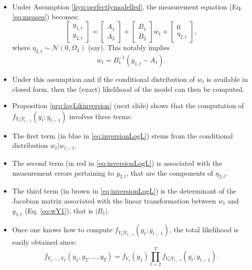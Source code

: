 \documentclass[
  12pt,
]{book}
\providecommand{\tightlist}{%
  \setlength{\itemsep}{0pt}\setlength{\parskip}{0pt}}
\theoremstyle{definition}
\theoremstyle{definition}
\theoremstyle{definition}
\theoremstyle{definition}
\theoremstyle{remark}
\begin{document}
\begin{itemize}
\tightlist
\item
  Under Assumption \ref{hyp:perfectlymodelled}, the measurement equation (Eq. \eqref{eq:measeq}) becomes:
  \[
  \left[
  \begin{array}{c}
  y_{1,t}\\
  y_{2,t}
  \end{array}
  \right]
  =
  \left[
  \begin{array}{c}
  A_{1}\\
  A_{2}
  \end{array}
  \right]+
  \left[
  \begin{array}{c}
  B_{1}\\
  B_{2}
  \end{array}
  \right]w_t +
  \left[
  \begin{array}{c}
  0\\
  \eta_{2,t}
  \end{array}
  \right],
  \]
  where \(\eta_{2,t} \sim \mathcal{N}(0,\Omega_2)\) (say). This notably implies
  \begin{equation}
  w_t = B_{1}^{-1}(y_{1,t} - A_1).\label{eq:wY1}
  \end{equation}
\item
  Under this assumption and if the conditional distribution of \(w_t\) is available in closed form, then the (exact) likelihood of the model can then be computed.
\item
  Proposition \ref{prp:logLikinversion} (next slide) shows that the computation of \(f_{Y_t|\underline{Y_{t-1}}}(y_t;\underline{y_{t-1}})\) involves three terms:
\item
  The first term (in blue in \eqref{eq:inversionLogL}) stems from the conditional distribution \(w_t|\underline{w_{t-1}}\).
\item
  The second term (in red in \eqref{eq:inversionLogL}) is associated with the measurement errors pertaining to \(y_{2,t}\), that are the components of \(\eta_{2,t}\).
\item
  The third term (in brown in \eqref{eq:inversionLogL}) is the determinant of the Jacobian matrix associated with the linear transformation between \(w_t\) and \(y_{1,t}\) (Eq. \eqref{eq:wY1}), that is \(|B_1|\).
\item
  Once one knows how to compute \(f_{Y_t|\underline{Y_{t-1}}}(y_t;\underline{y_{t-1}})\), the total likelihood is easily obtained since:
  \[
  f_{Y_1,\dots,Y_T}(y_1,y_2,\dots,y_T) = f_{Y_1}(y_1) \prod_{t=2}^T f_{Y_t|\underline{Y_{t-1}}}(y_t;\underline{y_{t-1}}).
  \]
\end{itemize}
\end{document}
